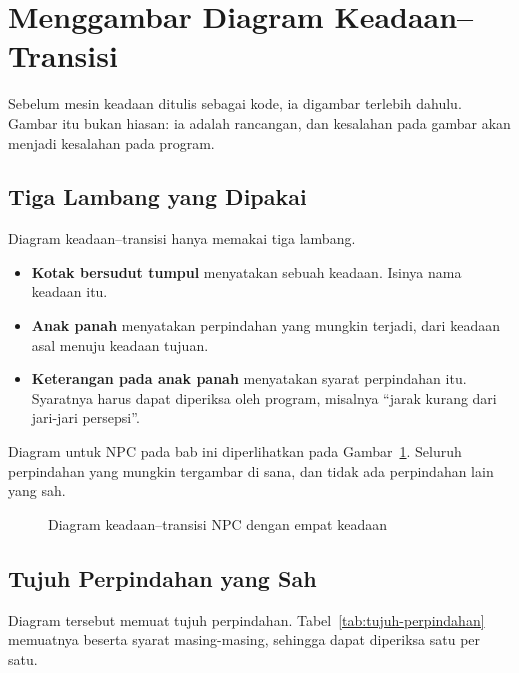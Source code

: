 \section{Menggambar Diagram Keadaan--Transisi}
\label{sec:diagram-keadaan}

Sebelum mesin keadaan ditulis sebagai kode, ia digambar terlebih dahulu.
Gambar itu bukan hiasan: ia adalah rancangan, dan kesalahan pada gambar akan
menjadi kesalahan pada program.

\subsection{Tiga Lambang yang Dipakai}

Diagram keadaan--transisi hanya memakai tiga lambang.

\begin{itemize}
  \item \textbf{Kotak bersudut tumpul} menyatakan sebuah keadaan. Isinya nama
        keadaan itu.
  \item \textbf{Anak panah} menyatakan perpindahan yang mungkin terjadi, dari
        keadaan asal menuju keadaan tujuan.
  \item \textbf{Keterangan pada anak panah} menyatakan syarat perpindahan itu.
        Syaratnya harus dapat diperiksa oleh program, misalnya ``jarak kurang
        dari jari-jari persepsi''.
\end{itemize}

Diagram untuk NPC pada bab ini diperlihatkan pada
Gambar~\ref{fig:diagram-keadaan}. Seluruh perpindahan yang
mungkin tergambar di sana, dan tidak ada perpindahan lain yang sah.

\begin{figure}[htbp]
\centering

\caption{Diagram keadaan--transisi NPC dengan empat keadaan}
\label{fig:diagram-keadaan}
\end{figure}

\subsection{Tujuh Perpindahan yang Sah}

Diagram tersebut memuat tujuh perpindahan. Tabel~\ref{tab:tujuh-perpindahan}
memuatnya beserta syarat masing-masing, sehingga dapat diperiksa satu per satu.

